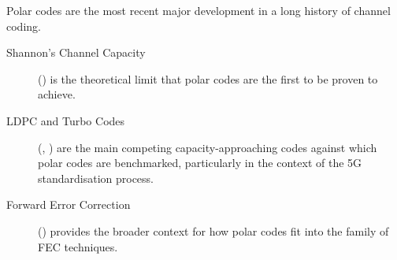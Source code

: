 \begin{importantbox}[title={Further Reading}]
    Polar codes are the most recent major development in a long history of channel coding.
    \begin{description}
        \item[Shannon's Channel Capacity] () is the theoretical limit that polar codes are the first to be proven to achieve.
        \item[LDPC and Turbo Codes] (, ) are the main competing capacity-approaching codes against which polar codes are benchmarked, particularly in the context of the 5G standardisation process.
        \item[Forward Error Correction] () provides the broader context for how polar codes fit into the family of FEC techniques.
    \end{description}
\end{importantbox}